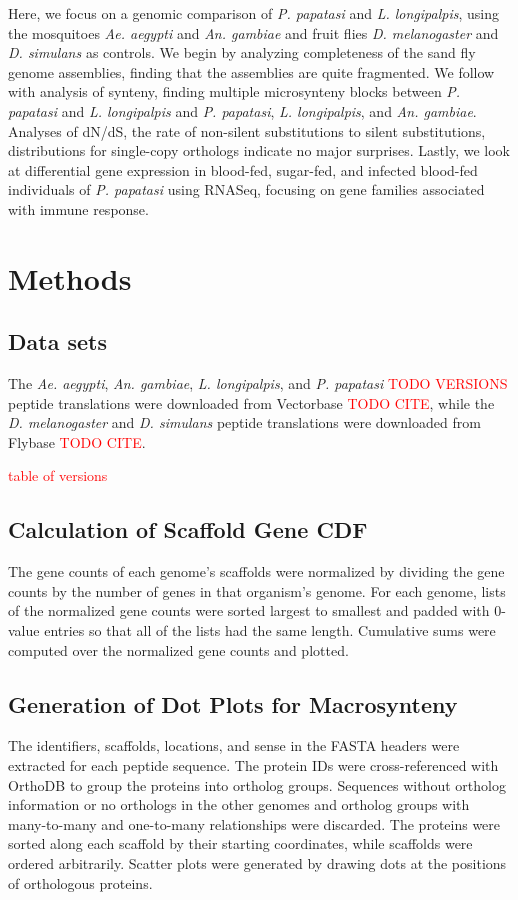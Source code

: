 Here, we focus on a genomic comparison of \emph{P. papatasi} and \emph{L. longipalpis}, using the mosquitoes \emph{Ae. aegypti} and \emph{An. gambiae} and fruit flies \emph{D. melanogaster} and \emph{D. simulans} as controls.  We begin by analyzing completeness of the sand fly genome assemblies, finding that the assemblies are quite fragmented.  We follow with analysis of synteny, finding multiple microsynteny blocks between \emph{P. papatasi} and \emph{L. longipalpis} and \emph{P. papatasi}, \emph{L. longipalpis}, and \emph{An. gambiae}. Analyses of dN/dS, the rate of non-silent substitutions to silent substitutions, distributions for single-copy orthologs indicate no major surprises.  Lastly, we look at differential gene expression in blood-fed, sugar-fed, and infected blood-fed individuals of \emph{P. papatasi} using RNASeq, focusing on gene families associated with immune response.

\section{Methods}

\subsection{Data sets}


The \emph{Ae. aegypti}, \emph{An. gambiae}, \emph{L. longipalpis}, and \emph{P. papatasi} \textcolor{red}{TODO VERSIONS} peptide translations were downloaded from Vectorbase \textcolor{red}{TODO CITE}, while the \emph{D. melanogaster} and \emph{D. simulans} peptide translations were downloaded from Flybase \textcolor{red}{TODO CITE}.

\textcolor{red}{table of versions}


\subsection{Calculation of Scaffold Gene CDF}
The gene counts of each genome's scaffolds were normalized by dividing the gene counts by the number of genes in that organism's genome. For each genome, lists of the normalized gene counts were sorted largest to smallest and padded with 0-value entries so that all of the lists had the same length.  Cumulative sums were computed over the normalized gene counts and plotted.


\subsection{Generation of Dot Plots for Macrosynteny} \label{sec:synteny-methods-dotplots}
The identifiers, scaffolds, locations, and sense in the FASTA headers were extracted for each peptide sequence.  The protein IDs were cross-referenced with OrthoDB to group the proteins into ortholog groups.  Sequences without ortholog information or no orthologs in the other genomes and ortholog groups with many-to-many and one-to-many relationships were discarded.  The proteins were sorted along each scaffold by their starting coordinates, while scaffolds were ordered arbitrarily.  Scatter plots were generated by drawing dots at the positions of orthologous proteins.

